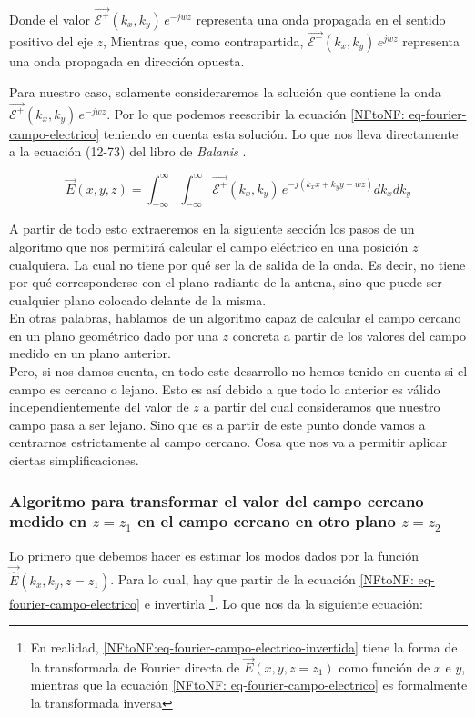 \documentclass{article}
\begin{document}
Donde el valor $\vec{\mathcal{E}^{+}}(k_{x},k_{y})\,e^{-j w z}$  representa una onda propagada en el sentido positivo del eje $z$, Mientras que, como contrapartida, $\vec{\mathcal{E}^{-}}(k_{x},k_{y})\,e^{j w z}$ representa una onda propagada en dirección opuesta.\\

\newpage

Para nuestro caso, solamente consideraremos la solución que contiene la onda $\vec{\mathcal{E}^{+}}(k_{x},k_{y})\,e^{-j w z}$. Por lo que podemos reescribir la ecuación \eqref{NFtoNF: eq-fourier-campo-electrico} teniendo en cuenta esta solución. Lo que nos lleva directamente a la ecuación (12-73) del libro de \textit{Balanis}  \autocite{Balanis_2016}.

\begin{equation}
\vec{E}(x,y,z)=\int_{-\infty}^{\infty}\int_{-\infty}^{\infty}\vec{\mathcal{E}^{+}}(k_{x},k_{y})
\,e^{-j (k_{x} x+k_{y} y+w  z)} dk_{x} dk_{y}
\label{NFtoNF:eq-fourier-balanis}
\end{equation}

A partir de todo esto extraeremos en la siguiente sección los pasos de un
algoritmo que nos permitirá calcular el campo eléctrico en una
posición $z$ cualquiera. La cual no tiene por qué ser la de salida de la onda. Es decir, no tiene por qué corresponderse con el plano radiante de la antena, sino que puede
ser cualquier plano colocado delante de la misma.
\\

En otras palabras, hablamos de un algoritmo capaz de calcular el campo cercano en un plano
geométrico dado por una $z$ concreta a partir de los valores del campo medido en un plano anterior.\\
Pero, si nos damos cuenta, en todo este desarrollo no hemos tenido en cuenta si el campo es cercano o lejano.
Esto es así debido a que todo lo anterior es válido independientemente del valor de  $z$ a partir del cual consideramos que nuestro campo pasa a ser lejano. Sino que es a partir de este punto donde vamos a centrarnos estrictamente al campo cercano. Cosa que nos va a permitir aplicar ciertas simplificaciones.

\subsubsection{Algoritmo para transformar el valor del campo cercano medido en $z=z_{1}$ en el campo cercano en otro plano $z=z_{2}$}

Lo primero que debemos hacer es estimar los modos dados por la función
$\vec{\hat{E}}(k_{x},k_{y},z=z_{1})$. Para lo cual, hay que partir de la
ecuación \eqref{NFtoNF: eq-fourier-campo-electrico} e invertirla \footnote{En realidad, \eqref{NFtoNF:eq-fourier-campo-electrico-invertida} tiene la forma de
la transformada de Fourier directa de $\vec{E}(x,y,z=z_{1})$ como
función de $x$ e $y$, mientras que la ecuación \eqref{NFtoNF: eq-fourier-campo-electrico}
es formalmente la transformada inversa}. Lo que nos da la siguiente ecuación:
\end{document}
